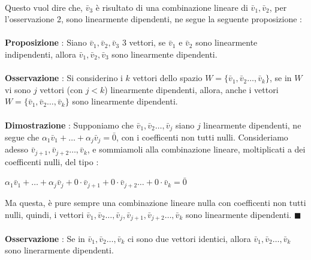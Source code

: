 \documentclass[12pt, letterpaper]{article}
\newcommand{\ve}{{\bar v}}
\newcommand{\acc}{\\\hphantom{}\\}
\begin{document}
\\Questo vuol dire che, \(\bar v_3\) è risultato di una combinazione lineare di  \(\bar v_1,\bar v_2 \), 
per l'osservazione 2, sono linearmente dipendenti, ne segue la seguente proposizione :
 \acc\textbf{Proposizione }: Siano \(\bar v_1,\bar v_2,\bar v_3\) 3 vettori, se \(\bar v_1\) e \(\bar v_2\)
sono linearmente indipendenti, allora \(\bar v_1,\bar v_2,\bar v_3\) sono linearmente dipendenti.\acc 
\textbf{Osservazione }: Si considerino i \(k\) vettori dello spazio   \(W=\{\bar v_1,\bar v_2\dots,\bar v_k\}\),
 se in \(W\) vi sono \(j\) vettori (con \(j<k\)) linearmente dipendenti, allora, anche i vettori 
 \(W=\{\bar v_1,\bar v_2\dots,\bar v_k\}\) sono linearmente dipendenti.\acc
 \textbf{Dimostrazione} : Supponiamo che \(\bar v_1,\bar v_2\dots,\bar v_j\) siano \(j\) 
 linearmente dipendenti, ne segue che \(\alpha_1\bar v_1+\dots+\alpha_j\bar v_j=\bar 0\), con i coefficenti 
 non tutti nulli. Consideriamo adesso \(\bar v_{j+1},\bar v_{j+2}\dots,\bar v_{k}\), e sommiamoli alla combinazione 
 lineare, moltiplicati a dei coefficenti nulli, del tipo : \begin{center}
    \(\alpha_1\bar v_1+\dots+\alpha_j\bar v_j+0\cdot\bar v_{j+1}+0\cdot\bar v_{j+2}\dots+0\cdot\bar v_{k}=\bar 0\)
 \end{center}
 Ma questa, è pure sempre una combinazione lineare nulla con coefficenti non tutti nulli, quindi, 
 i vettori \(\bar v_1,\bar v_2\dots,\bar v_j,\bar v_{j+1},\bar v_{j+2}\dots,\bar v_k\) sono linearmente 
 dipendenti. \(\blacksquare\)\acc 
 \textbf{Osservazione }: Se in \(\ve_1,\ve_2\dots,\ve_k\) ci sono due vettori identici, allora 
 \(\ve_1,\ve_2\dots,\ve_k\) sono linerarmente dipendenti.
\end{document}
